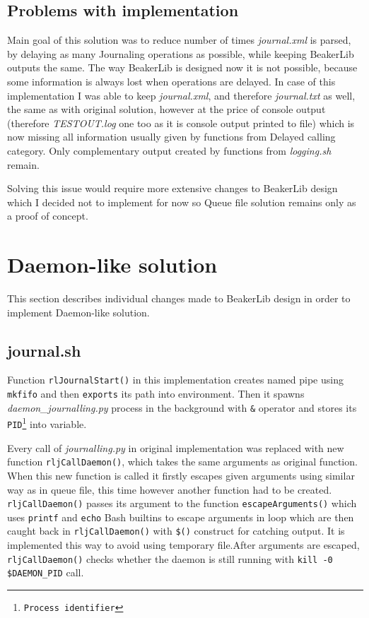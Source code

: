 \subsection{Problems with implementation}
Main goal of this solution was to reduce number of times \textit{journal.xml} is parsed, by delaying as many Journaling operations as possible, while keeping BeakerLib outputs the same. The way BeakerLib is designed now it is not possible, because some information is always lost when operations are delayed. In case of this implementation I was able to keep \textit{journal.xml}, and therefore \textit{journal.txt}  as well, the same as with original solution, however at the price of console output (therefore \textit{TESTOUT.log} one too as it is console output printed to file) which is now missing all information usually given by functions from Delayed calling category. Only complementary output created by functions from \textit{logging.sh} remain.

Solving this issue would require more extensive changes to BeakerLib design which I decided not to implement for now so Queue file solution remains only as a proof of concept.

\section{Daemon-like solution}
This section describes individual changes made to BeakerLib design in order to implement Daemon-like solution.

\subsection{journal.sh}
Function \texttt{rlJournalStart()} in this implementation creates named pipe using \texttt{mkfifo} and then \texttt{exports} its path into environment.
Then it spawns \textit{daemon\_journalling.py} process in the background with \texttt{\&} operator and stores its \texttt{PID\footnote{Process identifier}} into variable.

Every call of \textit{journalling.py} in original implementation was replaced with new function \texttt{rljCallDaemon()}, which takes the same arguments as original function. When this new function is called it firstly escapes given arguments using similar way as in queue file, this time however another function had to be created.  \texttt{rljCallDaemon()} passes its argument to the function \texttt{escapeArguments()} which uses \texttt{printf} and \texttt{echo} Bash builtins to escape arguments in loop which are then caught back in \texttt{rljCallDaemon()} with \texttt{\$()} construct\cite{command_substitution} for catching output. It is implemented this way to avoid using temporary file.After arguments are escaped, \texttt{rljCallDaemon()} checks whether the daemon is still running with \texttt{kill -0 \$DAEMON\_PID} call. 

